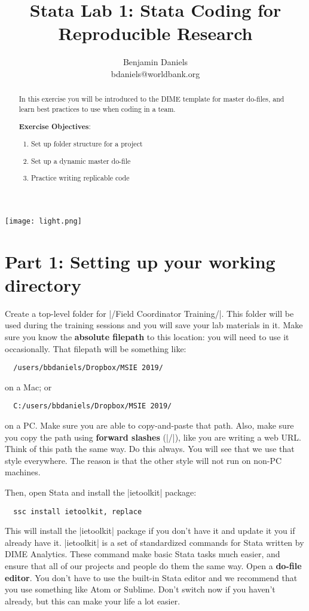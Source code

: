 \documentclass{tufte-handout}
\title{Stata Lab 1: Stata Coding for Reproducible Research}
\author{Benjamin Daniels \\ bdaniels@worldbank.org}
\begin{document}
\maketitle%

\begin{marginfigure}%
  \texttt{[image: light.png]}
\end{marginfigure}

\begin{abstract}
In this exercise you will be introduced to the DIME template for master do-files,
and learn best practices to use when coding in a team.

\bigskip\noindent \textbf{Exercise Objectives}:
\begin{enumerate}
  \item Set up folder structure for a project
  \item Set up a dynamic master do-file
  \item Practice writing replicable code
\end{enumerate}
\end{abstract}

\section{Part 1: Setting up your working directory}

Create a top-level folder for |/Field Coordinator Training/|.
This folder will be used during the training sessions
and you will save your lab materials in it.
Make sure you know the \textbf{absolute filepath} to this location:
you will need to use it occasionally.
That filepath will be something like:
\begin{Verbatim}
  /users/bbdaniels/Dropbox/MSIE 2019/
\end{Verbatim}
on a Mac; or
\begin{Verbatim}
  C:/users/bbdaniels/Dropbox/MSIE 2019/
\end{Verbatim}
on a PC. Make sure you are able to copy-and-paste that path.
Also, make sure you copy the path using \textbf{forward slashes} (|/|),
like you are writing a web URL. Think of this path the same way.
Do this always. You will see that we use that style everywhere.
The reason is that the other style will not run on non-PC machines.

Then, open Stata and install the |ietoolkit| package:
\begin{Verbatim}
  ssc install ietoolkit, replace
\end{Verbatim}
This will install the |ietoolkit| package if you don’t have it
and update it you if already have it.
|ietoolkit| is a set of standardized commands for Stata
written by DIME Analytics.
These command make basic Stata tasks much easier,
and ensure that all of our projects and people do them the same way.
Open a \textbf{do-file editor}.
You don't have to use the built-in Stata editor
and we recommend that you use something like Atom or Sublime.
Don't switch now if you haven't already,
but this can make your life a lot easier.
\end{document}

